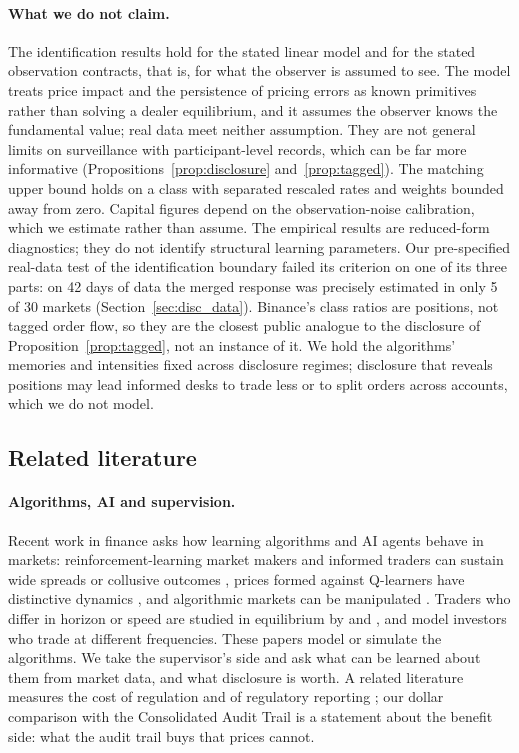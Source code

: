 \documentclass[12pt]{article}
\theoremstyle{definition}
\theoremstyle{remark}
\begin{document}
\paragraph{What we do not claim.} The identification results hold for the stated linear model and for the stated observation contracts, that is, for what the observer is assumed to see. The model treats price impact and the persistence of pricing errors as known primitives rather than solving a dealer equilibrium, and it assumes the observer knows the fundamental value; real data meet neither assumption. They are not general limits on surveillance with participant-level records, which can be far more informative (Propositions~\ref{prop:disclosure} and~\ref{prop:tagged}). The matching upper bound holds on a class with separated rescaled rates and weights bounded away from zero. Capital figures depend on the observation-noise calibration, which we estimate rather than assume. The empirical results are reduced-form diagnostics; they do not identify structural learning parameters. Our pre-specified real-data test of the identification boundary failed its criterion on one of its three parts: on 42 days of data the merged response was precisely estimated in only 5 of 30 markets (Section~\ref{sec:disc_data}). Binance's class ratios are positions, not tagged order flow, so they are the closest public analogue to the disclosure of Proposition~\ref{prop:tagged}, not an instance of it. We hold the algorithms' memories and intensities fixed across disclosure regimes; disclosure that reveals positions may lead informed desks to trade less or to split orders across accounts, which we do not model.

\subsection{Related literature}\label{sec:lit}

\paragraph{Algorithms, AI and supervision.} Recent work in finance asks how learning algorithms and AI agents behave in markets: reinforcement-learning market makers and informed traders can sustain wide spreads or collusive outcomes \citep{colliard2022,dou2025}, prices formed against Q-learners have distinctive dynamics \citep{banerjee2026}, and algorithmic markets can be manipulated \citep{tremacoldi2025}. Traders who differ in horizon or speed are studied in equilibrium by \citet{cespa2015} and \citet{biais2015}, and \citet{crouzet2020} model investors who trade at different frequencies. These papers model or simulate the algorithms. We take the supervisor's side and ask what can be learned about them from market data, and what disclosure is worth. A related literature measures the cost of regulation and of regulatory reporting \citep{trebbi2024}; our dollar comparison with the Consolidated Audit Trail is a statement about the benefit side: what the audit trail buys that prices cannot.
\end{document}
